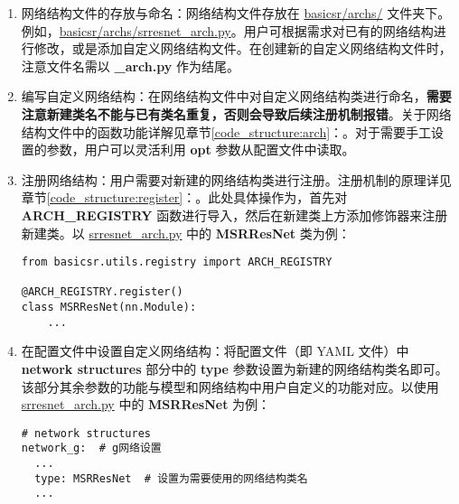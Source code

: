 \documentclass[../main.tex]{subfiles}
\begin{document}
\begin{enumerate}[第 1 步]
    \item 网络结构文件的存放与命名：网络结构文件存放在 \href{https://github.com/XPixelGroup/BasicSR/tree/master/basicsr/archs}{basicsr/archs/} 文件夹下。例如，\href{https://github.com/XPixelGroup/BasicSR/tree/master/basicsr/archs}{basicsr/archs/srresnet\_arch.py}。用户可根据需求对已有的网络结构进行修改，或是添加自定义网络结构文件。在创建新的自定义网络结构文件时，注意文件名需以  \textbf{\_arch.py} 作为结尾。

    \item 编写自定义网络结构：在网络结构文件中对自定义网络结构类进行命名，\textbf{需要注意新建类名不能与已有类名重复，否则会导致后续注册机制报错}。关于网络结构文件中的函数功能详解见章节\ref{code_structure:arch}：。对于需要手工设置的参数，用户可以灵活利用 \textbf{opt} 参数从配置文件中读取。

    \item 注册网络结构：用户需要对新建的网络结构类进行注册。注册机制的原理详见章节\ref{code_structure:register}：。此处具体操作为，首先对 \textbf{ARCH\_REGISTRY} 函数进行导入，然后在新建类上方添加修饰器来注册新建类。以 \href{https://github.com/XPixelGroup/BasicSR/tree/master/basicsr/archs/srresnet_arch.py}{srresnet\_arch.py} 中的 \textbf{MSRResNet} 类为例：
\begin{verbatim}
from basicsr.utils.registry import ARCH_REGISTRY

@ARCH_REGISTRY.register()
class MSRResNet(nn.Module):
    ...
\end{verbatim}

    \item 在配置文件中设置自定义网络结构：将配置文件（即 YAML 文件）中 \textbf{network structures} 部分中的 \textbf{type} 参数设置为新建的网络结构类名即可。
          该部分其余参数的功能与模型和网络结构中用户自定义的功能对应。以使用 \href{https://github.com/XPixelGroup/BasicSR/tree/master/basicsr/archs/srresnet_arch.py}{srresnet\_arch.py} 中的 \textbf{MSRResNet} 为例：

\begin{verbatim}
# network structures
network_g:  # g网络设置
  ...
  type: MSRResNet  # 设置为需要使用的网络结构类名
  ...
\end{verbatim}
\end{enumerate}

\end{document}
